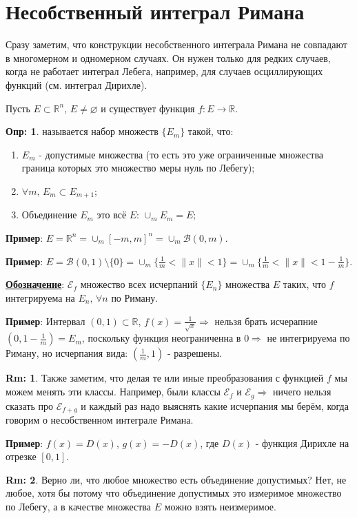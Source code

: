 \documentclass[12pt]{article}
\newcommand{\RN}[1]{%
	\textup{\uppercase\expandafter{\romannumeral#1}}%
}
\newcommand{\MR}{\mathbb{R}}
\newcommand{\MB}{\mathcal{B}}
\newcommand{\VN}{\varnothing}
\theoremstyle{definition}
\newtheorem{defn}{Опр:}
\newtheorem{rem}{Rm:}
\begin{document}
\lhead{Математический анализ - \RN{4}}
\section*{Несобственный интеграл Римана}
Сразу заметим, что конструкции несобственного интеграла Римана не совпадают в многомерном и одномерном случаях. Он нужен только для редких случаев, когда не работает интеграл Лебега, например, для случаев осциллирующих функций (см. интеграл Дирихле).

Пусть $E \subset \MR^n, \, E \neq \VN$ и существует функция $f\colon E \to \MR$.
\begin{defn}
	 называется набор множеств $\{E_m\}$ такой, что:
	\begin{enumerate}[label=\arabic*)]
		\item $E_m$ - допустимые множества (то есть это уже ограниченные множества граница которых это множество меры нуль по Лебегу);
		\item $\forall m, \, E_m \subset E_{m+1}$;
		\item Объединение $E_m$ это всё $E$: $\cup_m E_m = E$;
	\end{enumerate}
\end{defn}
\textbf{Пример}: $E = \MR^n = \cup_m[-m,m]^n = \cup_m \MB(0,m)$.

\textbf{Пример}: $E = \MB(0,1) \setminus \{0\} = \cup_m \{\frac{1}{m} < \|x\| < 1\} = \cup_m \{\frac{1}{m} < \|x\| < 1 - \frac{1}{m}\}$.

\textbf{\uline{Обозначение}}: $\mathcal{E}_f$ множество всех исчерпаний $\{E_n\}$ множества $E$ таких, что $f$ интегрируема на $E_n, \, \forall n$ по Риману.

\textbf{Пример}: Интервал $(0,1) \subset \MR$, $f(x) = \tfrac{1}{\sqrt{x}} \Rightarrow$ нельзя брать исчерапние $(0,1 - \frac{1}{m}) = E_m$, поскольку функция неограниченна в $0 \Rightarrow$ не интегрируема по Риману, но исчерпания вида: $(\frac{1}{m},1)$ - разрешены.

\begin{rem}
	Также заметим, что делая те или иные преобразования с функцией $f$ мы можем менять эти классы. Например, были классы $\mathcal{E}_f$ и $\mathcal{E}_g \Rightarrow$ ничего нельзя сказать про $\mathcal{E}_{f + g}$ и каждый раз надо выяснять какие исчерпания мы берём, когда говорим о несобственном интеграле Римана.
\end{rem}
\textbf{Пример}: $f(x) = D(x)$, $g(x) = - D(x)$, где $D(x)$ - функция Дирихле на отрезке $[0,1]$.
\begin{rem}
	Верно ли, что любое множество есть объединение допустимых? Нет, не любое, хотя бы потому что объединение допустимых это измеримое множество по Лебегу, а в качестве множества $E$ можно взять неизмеримое.
\end{rem}
\end{document}
